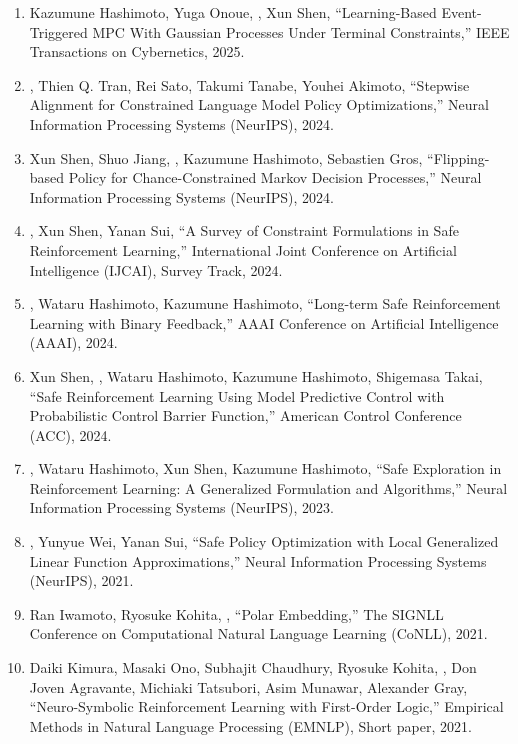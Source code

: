 \begin{enumerate}[leftmargin=*,itemsep=0.35em]
\item 
Kazumune Hashimoto, Yuga Onoue, \aw, Xun Shen,
``Learning-Based Event-Triggered MPC With Gaussian Processes Under Terminal Constraints,''
IEEE Transactions on Cybernetics, 2025.

\item
\aw, Thien Q. Tran, Rei Sato, Takumi Tanabe, Youhei Akimoto,
``Stepwise Alignment for Constrained Language Model Policy Optimizations,''
Neural Information Processing Systems (NeurIPS), 2024.

\item
Xun Shen, Shuo Jiang, \aw, Kazumune Hashimoto, Sebastien Gros,
``Flipping-based Policy for Chance-Constrained Markov Decision Processes,''
Neural Information Processing Systems (NeurIPS), 2024.


\item 
\aw, Xun Shen, Yanan Sui,
``A Survey of Constraint Formulations in Safe Reinforcement Learning,''
International Joint Conference on Artificial Intelligence (IJCAI), Survey Track, 2024.

\item 
\aw, Wataru Hashimoto, Kazumune Hashimoto,
``Long-term Safe Reinforcement Learning with Binary Feedback,''
AAAI Conference on Artificial Intelligence (AAAI), 2024.

\item
Xun Shen, \aw, Wataru Hashimoto, Kazumune Hashimoto, Shigemasa Takai,
``Safe Reinforcement Learning Using Model Predictive Control with Probabilistic Control Barrier Function,''
American Control Conference (ACC), 2024.

\item 
\aw, Wataru Hashimoto, Xun Shen, Kazumune Hashimoto,
``Safe Exploration in Reinforcement Learning: A Generalized Formulation and Algorithms,''
Neural Information Processing Systems (NeurIPS), 2023.

\item
\aw, Yunyue Wei, Yanan Sui,
``Safe Policy Optimization with Local Generalized Linear Function Approximations,''
Neural Information Processing Systems (NeurIPS), 2021.

\item
Ran Iwamoto, Ryosuke Kohita, \aw,
``Polar Embedding,''
The SIGNLL Conference on Computational Natural Language Learning (CoNLL), 2021.

\item 
Daiki Kimura, Masaki Ono, Subhajit Chaudhury, Ryosuke Kohita, \aw, Don Joven Agravante, Michiaki Tatsubori, Asim Munawar, Alexander Gray,
``Neuro-Symbolic Reinforcement Learning with First-Order Logic,''
Empirical Methods in Natural Language Processing (EMNLP), Short paper, 2021.


\end{enumerate}
